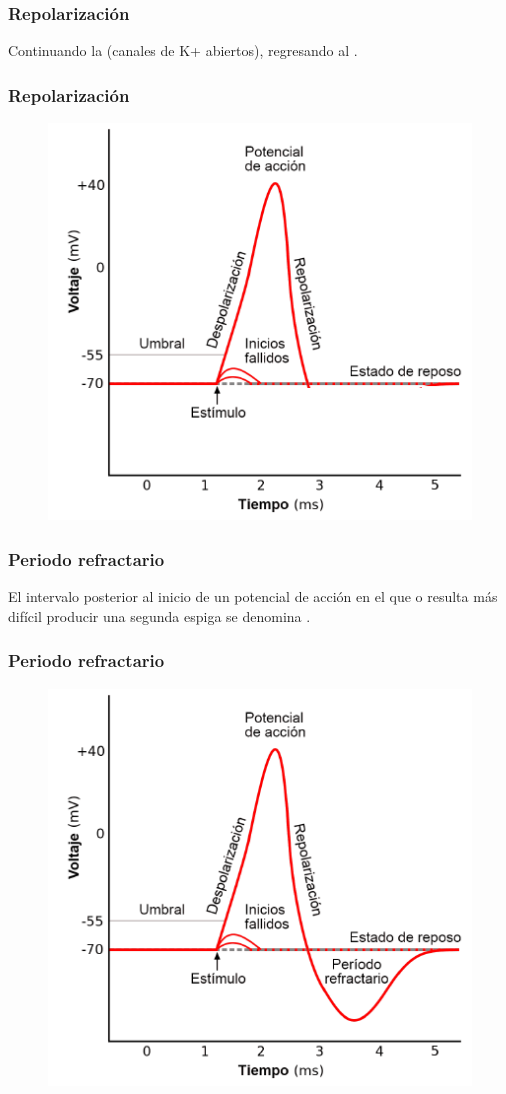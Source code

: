 \documentclass[14pt]{beamer}
\begin{document}
\begin{frame}
\frametitle{Repolarización}
Continuando la  (canales de K+ abiertos), regresando al .
\end{frame}
\begin{frame}
\frametitle{Repolarización}
\begin{figure}
    \centering
    \includegraphics[scale=0.58]{Imagenes/Potencial_Accion_08d.png}
\end{figure}
\end{frame}
\begin{frame}
\frametitle{Periodo refractario}
El intervalo posterior al inicio de un potencial de acción en el que  o resulta más difícil producir una segunda espiga se denomina .
\end{frame}
\begin{frame}
\frametitle{Periodo refractario}
\begin{figure}
    \centering
    \includegraphics[scale=0.58]{Imagenes/Potencial_Accion_06.png}
\end{figure}
\end{frame}
\end{document}
